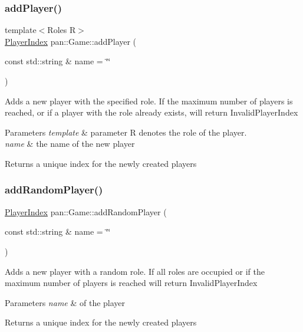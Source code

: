 \subsubsection{\texorpdfstring{add\+Player()}{addPlayer()}}
{\footnotesize\ttfamily template$<$Roles R$>$ \\
\hyperlink{namespacepan_a0cdabf874fbf1bb3a1f0152d108c2909}{Player\+Index} pan\+::\+Game\+::add\+Player (\begin{DoxyParamCaption}\item[{const std\+::string \&}]{name = {\ttfamily \char`\"{}\char`\"{}} }\end{DoxyParamCaption})}

Adds a new player with the specified role. If the maximum number of players is reached, or if a player with the role already exists, will return Invalid\+Player\+Index 
\begin{DoxyParams}{Parameters}
{\em template} & parameter R denotes the role of the player. \\
\hline
{\em name} & the name of the new player \\
\hline
\end{DoxyParams}
\begin{DoxyReturn}{Returns}
a unique index for the newly created players 
\end{DoxyReturn}
\mbox{\label{classpan_1_1_game_adce8b415591cac36cf8f39602f0736c4}} 
\subsubsection{\texorpdfstring{add\+Random\+Player()}{addRandomPlayer()}}
{\footnotesize\ttfamily \hyperlink{namespacepan_a0cdabf874fbf1bb3a1f0152d108c2909}{Player\+Index} pan\+::\+Game\+::add\+Random\+Player (\begin{DoxyParamCaption}\item[{const std\+::string \&}]{name = {\ttfamily \char`\"{}\char`\"{}} }\end{DoxyParamCaption})}

Adds a new player with a random role. If all roles are occupied or if the maximum number of players is reached will return Invalid\+Player\+Index 
\begin{DoxyParams}{Parameters}
{\em name} & of the player \\
\hline
\end{DoxyParams}
\begin{DoxyReturn}{Returns}
a unique index for the newly created players 
\end{DoxyReturn}
\mbox{\label{classpan_1_1_game_a463480ea3f29b34629059134c416ffa0}} 
